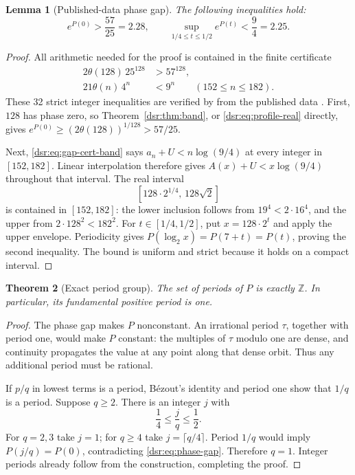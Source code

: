 \documentclass[11pt,a4paper]{article}
\numberwithin{equation}{section}
\newtheorem{theorem}{Theorem}[section]
\newtheorem{lemma}[theorem]{Lemma}
\theoremstyle{definition}
\theoremstyle{remark}
\newcommand{\Z}{\mathbb Z}
\newcommand{\code}[1]{\texttt{\detokenize{#1}}}
\theoremstyle{definition}
\theoremstyle{plain}
\begin{document}
\begin{lemma}[Published-data phase gap]
\label{dsr:lem:phase-gap}
The following inequalities hold:
\begin{equation}
 e^{P(0)}>\frac{57}{25}=2.28,
 \qquad
 \sup_{1/4\le t\le1/2}e^{P(t)}<\frac94=2.25.
\label{dsr:eq:phase-gap}
\end{equation}
\end{lemma}
\begin{proof}
All arithmetic needed for the proof is contained in the finite certificate
\begin{align}
 2\theta(128)\,25^{128}&>57^{128}, \label{dsr:eq:gap-cert-one}\\
 21\theta(n)\,4^n&<9^n\qquad(152\le n\le182). \label{dsr:eq:gap-cert-band}
\end{align}
These 32 strict integer inequalities are verified by \code{verify.py} from
the published data \cite{OEIS}. First, $128$ has phase zero, so
Theorem~\ref{dsr:thm:band}, or \eqref{dsr:eq:profile-real} directly, gives
$e^{P(0)}\ge(2\theta(128))^{1/128}>57/25$.

Next, \eqref{dsr:eq:gap-cert-band} says $a_n+U<n\log(9/4)$ at every integer in
$[152,182]$. Linear interpolation therefore gives
$A(x)+U<x\log(9/4)$ throughout that interval. The real interval
\[
 [128\cdot2^{1/4},\,128\sqrt2]
\]
is contained in $[152,182]$: the lower inclusion follows from
$19^4<2\cdot16^4$, and the upper from $2\cdot128^2<182^2$.
For $t\in[1/4,1/2]$, put $x=128\cdot2^t$ and apply the upper envelope.
Periodicity gives $P(\log_2x)=P(7+t)=P(t)$, proving the second inequality.
The bound is uniform and strict because it holds on a compact interval.
\end{proof}

\begin{theorem}[Exact period group]
\label{dsr:thm:period}
The set of periods of $P$ is exactly $\Z$. In particular, its fundamental
positive period is one.
\end{theorem}
\begin{proof}
The phase gap makes $P$ nonconstant. An irrational period $\tau$, together
with period one, would make $P$ constant: the multiples of $\tau$ modulo one
are dense, and continuity propagates the value at any point along that dense
orbit. Thus any additional period must be rational.

If $p/q$ in lowest terms is a period, B\'ezout's identity and period one show
that $1/q$ is a period. Suppose $q\ge2$. There is an integer $j$ with
\begin{equation}
 \frac14\le\frac jq\le\frac12.
\end{equation}
For $q=2,3$ take $j=1$; for $q\ge4$ take $j=\lceil q/4\rceil$.
Period $1/q$ would imply $P(j/q)=P(0)$, contradicting
\eqref{dsr:eq:phase-gap}. Therefore $q=1$. Integer periods already follow from
the construction, completing the proof.
\end{proof}
\end{document}
